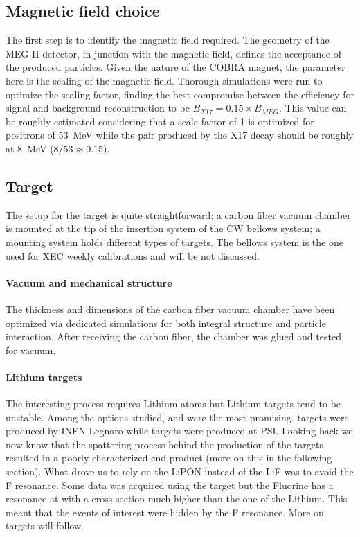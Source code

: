 \begin{refsection}
    \subsection{Magnetic field choice}
        The first step is to identify the magnetic field required. 
        The geometry of the MEG II detector, in junction with the magnetic field, defines the acceptance of the produced particles.
        Given the nature of the COBRA magnet, the parameter here is the scaling of the magnetic field.
        Thorough simulations were run to optimize the scaling factor, finding the best compromise between the efficiency for signal and background reconstruction to be $B_{X17}=0.15\times B_{MEG}$. 
        This value can be roughly estimated considering that a scale factor of 1 is optimized for positrons of \SI{53}{MeV} while the pair produced by the X17 decay should be roughly at \SI{8}{MeV} ($8/53\approx 0.15$). 
        
    \subsection{Target}
        The setup for the target is quite straightforward: a carbon fiber vacuum chamber is mounted at the tip of the insertion system of the CW bellows system; a mounting system holds different types of targets.
        The bellows system is the one used for XEC weekly calibrations and will be not discussed.
        
        \paragraph{Vacuum and mechanical structure}
        The thickness and dimensions of the carbon fiber vacuum chamber have been optimized via dedicated simulations for both integral structure and particle interaction.
        After receiving the carbon fiber, the chamber was glued and tested for vacuum.
        
        \paragraph{Lithium targets}
        The interesting process requires Lithium atoms but Lithium targets tend to be unstable. 
        Among the options studied,  and  were the most promising.
         targets were produced by INFN Legnaro while  targets were produced at PSI.
        Looking back we now know that the spattering process behind the production of the  targets resulted in a poorly characterized end-product (more on this in the following section).
        What drove us to rely on the LiPON instead of the LiF was to avoid the F resonance. 
        Some data was acquired using the  target but the Fluorine has a resonance at \SI{}{} with a cross-section much higher than the one of the Lithium.
        This meant that the events of interest were hidden by the F resonance.
        More on targets will follow.
        

\end{refsection}
